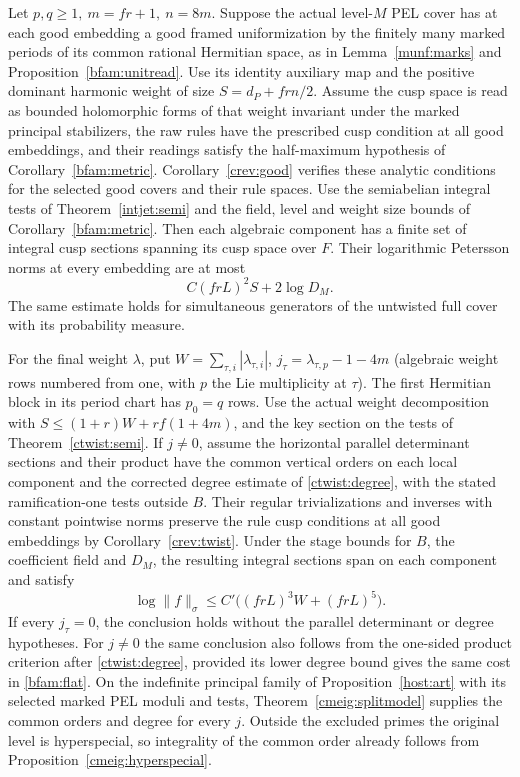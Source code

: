 \begin{theorem}\label{bfam:oncharts}
Let \(p,q\ge1,\ m=fr+1,\ n=8m\). Suppose the actual level-\(M\)
PEL cover has at each good embedding a good framed uniformization
by the finitely many marked periods of its common rational
Hermitian space, as in Lemma~\ref{munf:marks} and
Proposition~\ref{bfam:unitread}. Use its identity auxiliary map
and the positive dominant harmonic weight of size \(S=d_P+frn/2\).
Assume the cusp space is read as bounded holomorphic forms of that
weight invariant under the marked principal stabilizers, the raw
rules have the prescribed cusp condition at all good embeddings,
and their readings satisfy the half-maximum hypothesis of
Corollary~\ref{bfam:metric}. Corollary~\ref{crev:good} verifies
these analytic conditions for the selected good covers and their
rule spaces. Use the semiabelian integral tests
of Theorem~\ref{intjet:semi} and the field, level and weight size
bounds of Corollary~\ref{bfam:metric}. Then each algebraic
component has a finite set of integral cusp sections spanning
its cusp space over \(F\). Their logarithmic Petersson norms at
every embedding are at most
\[
                 C(frL)^2 S+2\log D_M .
\]
The same estimate holds for simultaneous generators of the
untwisted full cover with its probability measure.

For the final weight \(\lambda\), put \(W=\sum_{\tau,i}
|\lambda_{\tau,i}|\), \(j_\tau=\lambda_{\tau,p}-1-4m\)
(algebraic weight rows numbered from one, with \(p\) the Lie
multiplicity at \(\tau\)). The first Hermitian block in its period
chart has \(p_0=q\) rows. Use the actual weight decomposition
with \(S\le(1+r)W+rf(1+4m)\), and the key section on the tests of
Theorem~\ref{ctwist:semi}. If \(j\ne0\), assume the horizontal
parallel determinant sections and their product have the common
vertical orders on each local component and the corrected degree
estimate of \eqref{ctwist:degree}, with the stated ramification-one
tests outside \(B\). Their regular trivializations and inverses
with constant pointwise norms preserve the rule cusp conditions
at all good embeddings by Corollary~\ref{crev:twist}. Under the stage bounds
for \(B\), the coefficient field and \(D_M\), the resulting
integral sections span on each component and satisfy
\[
           \log\|f\|_\sigma
            \le C'\bigl((frL)^3 W+(frL)^5\bigr).
\]
If every \(j_\tau=0\), the conclusion holds without the parallel
determinant or degree hypotheses. For \(j\ne0\) the same conclusion
also follows from the one-sided product criterion after
\eqref{ctwist:degree}, provided its lower degree bound gives the
same cost in \eqref{bfam:flat}. On the indefinite principal
family of Proposition~\ref{host:art} with its selected marked
PEL moduli and tests, Theorem~\ref{cmeig:splitmodel} supplies the
common orders and degree for every \(j\). Outside the excluded
primes the original level is hyperspecial, so integrality of
the common order already follows from
Proposition~\ref{cmeig:hyperspecial}.
\end{theorem}
